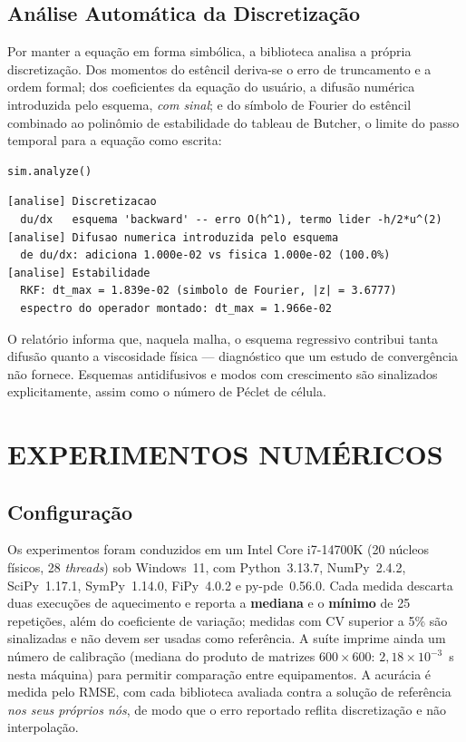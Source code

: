 \documentclass[10pt,brazil,english]{article}
\begin{document}
\subsection{Análise Automática da Discretização}
\label{sec:analise}

Por manter a equação em forma simbólica, a biblioteca analisa a própria discretização. Dos momentos do estêncil deriva-se o erro de truncamento e a ordem formal; dos coeficientes da equação do usuário, a difusão numérica introduzida pelo esquema, \emph{com sinal}; e do símbolo de Fourier do estêncil combinado ao polinômio de estabilidade do tableau de Butcher, o limite do passo temporal para a equação como escrita:

\begin{lstlisting}[float=htb, showstringspaces=false, language=Python]
sim.analyze()
\end{lstlisting}
\begin{lstlisting}[float=htb]
[analise] Discretizacao
  du/dx   esquema 'backward' -- erro O(h^1), termo lider -h/2*u^(2)
[analise] Difusao numerica introduzida pelo esquema
  de du/dx: adiciona 1.000e-02 vs fisica 1.000e-02 (100.0%)
[analise] Estabilidade
  RKF: dt_max = 1.839e-02 (simbolo de Fourier, |z| = 3.6777)
  espectro do operador montado: dt_max = 1.966e-02
\end{lstlisting}

O relatório informa que, naquela malha, o esquema regressivo contribui tanta difusão quanto a viscosidade física --- diagnóstico que um estudo de convergência não fornece. Esquemas antidifusivos e modos com crescimento são sinalizados explicitamente, assim como o número de Péclet de célula.

\section{EXPERIMENTOS NUMÉRICOS}

\subsection{Configuração}

Os experimentos foram conduzidos em um Intel Core i7-14700K (20 núcleos físicos, 28 \textit{threads}) sob Windows~11, com Python~3.13.7, NumPy~2.4.2, SciPy~1.17.1, SymPy~1.14.0, FiPy~4.0.2 e py-pde~0.56.0. Cada medida descarta duas execuções de aquecimento e reporta a \textbf{mediana} e o \textbf{mínimo} de 25 repetições, além do coeficiente de variação; medidas com CV superior a 5\% são sinalizadas e não devem ser usadas como referência. A suíte imprime ainda um número de calibração (mediana do produto de matrizes $600\times600$: $2{,}18\times10^{-3}$~s nesta máquina) para permitir comparação entre equipamentos. A acurácia é medida pelo RMSE, com cada biblioteca avaliada contra a solução de referência \emph{nos seus próprios nós}, de modo que o erro reportado reflita discretização e não interpolação.
\end{document}
